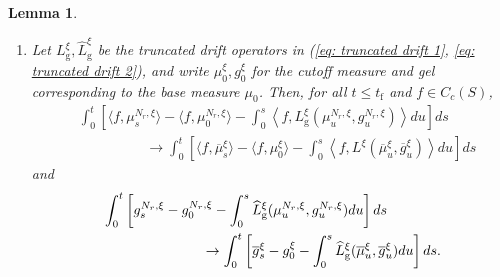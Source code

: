 \documentclass[11pt, notitlepage]{article}
\newtheorem{lem}[thm]{Lemma}
\begin{document}
\begin{lem}
\begin{enumerate}[label=\roman{*}).]
\begin{equation}
\end{equation}
\item Let $L^\xi_\mathrm{g}, \widehat{L}^\xi_\mathrm{g}$ be the truncated drift operators in (\ref{eq: truncated drift 1}, \ref{eq: truncated drift 2}), and write $\mu^\xi_0, g^\xi_0$ for the cutoff measure and gel corresponding to the base measure $\mu_0$. Then, for all $t\le t_\mathrm{f}$ and $f\in C_c(S)$, \begin{equation}\begin{split} &\int_0^t \left[\langle f, \mu^{N_r,\xi}_s\rangle-\langle f,\mu^{N_r,\xi}_0\rangle -\int_0^s\left\langle f, L^\xi_\mathrm{g}\left(\mu^{N_r,\xi}_u,g^{N_r,\xi}_u\right)\right\rangle du\right]ds \\& \hspace{2cm} \rightarrow \int_0^t \left[\langle f, \overline{\mu}^{\xi}_s\rangle-\langle f,\mu^{\xi}_0\rangle -\int_0^s\left\langle f, L^\xi\left(\overline{\mu}^{\xi}_u,\overline{g}^\xi_u\right)\right\rangle du\right]ds \end{split}\end{equation} and \begin{equation}\begin{split} & \int_0^t \left[g^{N_r,\xi}_s-g^{N_r,\xi}_0-\int_0^s \widehat{L}^\xi_\mathrm{g}(\mu^{N_r,\xi}_u,g^{N_r,\xi}_u)du\right]ds \\  & \hspace{2.5cm}\rightarrow \int_0^t \left[\overline{g}^{\xi}_s-g^{\xi}_0-\int_0^s \widehat{L}^\xi_\mathrm{g}(\overline{\mu}^{\xi}_u,\overline{g}^{\xi}_u)du\right]ds. \end{split}\end{equation}
\end{enumerate}
\end{lem}
\end{document}
